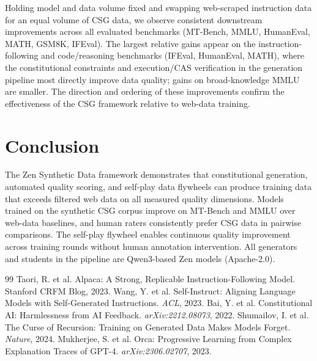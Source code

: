 \documentclass[11pt,a4paper]{article}
\begin{document}
Holding model and data volume fixed and swapping web-scraped instruction data for an
equal volume of CSG data, we observe consistent downstream improvements across all
evaluated benchmarks (MT-Bench, MMLU, HumanEval, MATH, GSM8K, IFEval). The largest
relative gains appear on the instruction-following and code/reasoning benchmarks
(IFEval, HumanEval, MATH), where the constitutional constraints and execution/CAS
verification in the generation pipeline most directly improve data quality; gains on
broad-knowledge MMLU are smaller. The direction and ordering of these improvements
confirm the effectiveness of the CSG framework relative to web-data training.

\section{Conclusion}

The Zen Synthetic Data framework demonstrates that constitutional generation, automated quality scoring, and self-play data flywheels can produce training data that exceeds filtered web data on all measured quality dimensions. Models trained on the synthetic CSG corpus improve on MT-Bench and MMLU over web-data baselines, and human raters consistently prefer CSG data in pairwise comparisons. The self-play flywheel enables continuous quality improvement across training rounds without human annotation intervention. All generators and students in the pipeline are Qwen3-based Zen models (Apache-2.0).

\begin{thebibliography}{99}
 Taori, R. et al. Alpaca: A Strong, Replicable Instruction-Following Model. Stanford CRFM Blog, 2023.
 Wang, Y. et al. Self-Instruct: Aligning Language Models with Self-Generated Instructions. \textit{ACL}, 2023.
 Bai, Y. et al. Constitutional AI: Harmlessness from AI Feedback. \textit{arXiv:2212.08073}, 2022.
 Shumailov, I. et al. The Curse of Recursion: Training on Generated Data Makes Models Forget. \textit{Nature}, 2024.
 Mukherjee, S. et al. Orca: Progressive Learning from Complex Explanation Traces of GPT-4. \textit{arXiv:2306.02707}, 2023.
\end{thebibliography}
\end{document}
